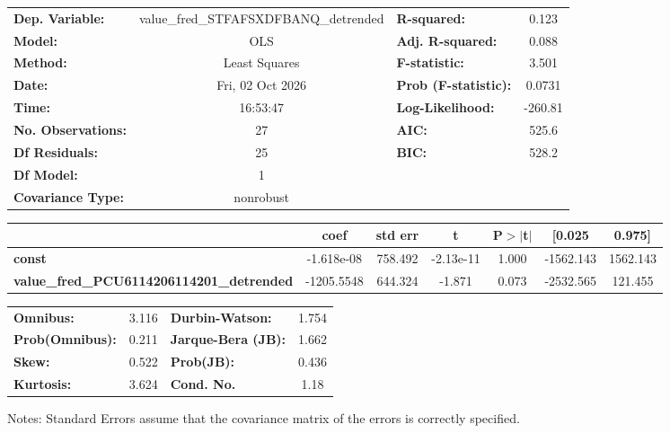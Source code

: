 \begin{center}
\begin{tabular}{lclc}
\toprule
\textbf{Dep. Variable:}                           & value\_fred\_STFAFSXDFBANQ\_detrended & \textbf{  R-squared:         } &     0.123   \\
\textbf{Model:}                                   &                  OLS                  & \textbf{  Adj. R-squared:    } &     0.088   \\
\textbf{Method:}                                  &             Least Squares             & \textbf{  F-statistic:       } &     3.501   \\
\textbf{Date:}                                    &            Fri, 02 Oct 2026           & \textbf{  Prob (F-statistic):} &   0.0731    \\
\textbf{Time:}                                    &                16:53:47               & \textbf{  Log-Likelihood:    } &   -260.81   \\
\textbf{No. Observations:}                        &                     27                & \textbf{  AIC:               } &     525.6   \\
\textbf{Df Residuals:}                            &                     25                & \textbf{  BIC:               } &     528.2   \\
\textbf{Df Model:}                                &                      1                & \textbf{                     } &             \\
\textbf{Covariance Type:}                         &               nonrobust               & \textbf{                     } &             \\
\bottomrule
\end{tabular}
\begin{tabular}{lcccccc}
                                                  & \textbf{coef} & \textbf{std err} & \textbf{t} & \textbf{P$> |$t$|$} & \textbf{[0.025} & \textbf{0.975]}  \\
\midrule
\textbf{const}                                    &   -1.618e-08  &      758.492     & -2.13e-11  &         1.000        &    -1562.143    &     1562.143     \\
\textbf{value\_fred\_PCU6114206114201\_detrended} &   -1205.5548  &      644.324     &    -1.871  &         0.073        &    -2532.565    &      121.455     \\
\bottomrule
\end{tabular}
\begin{tabular}{lclc}
\textbf{Omnibus:}       &  3.116 & \textbf{  Durbin-Watson:     } &    1.754  \\
\textbf{Prob(Omnibus):} &  0.211 & \textbf{  Jarque-Bera (JB):  } &    1.662  \\
\textbf{Skew:}          &  0.522 & \textbf{  Prob(JB):          } &    0.436  \\
\textbf{Kurtosis:}      &  3.624 & \textbf{  Cond. No.          } &     1.18  \\
\bottomrule
\end{tabular}
\end{center}

Notes: \newline
 [1] Standard Errors assume that the covariance matrix of the errors is correctly specified.